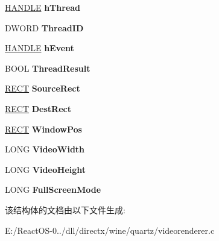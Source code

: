 \begin{DoxyCompactItemize}
\hyperlink{interfacevoid}{H\+A\+N\+D\+LE} {\bfseries h\+Thread}
\item 
\mbox{\label{struct_video_renderer_impl_aaca744e00d052fc034dd30f9d0a9c047}} 
D\+W\+O\+RD {\bfseries Thread\+ID}
\item 
\mbox{\label{struct_video_renderer_impl_a678ee72574f8cb5e784d7cd55672c141}} 
\hyperlink{interfacevoid}{H\+A\+N\+D\+LE} {\bfseries h\+Event}
\item 
\mbox{\label{struct_video_renderer_impl_a767c96e90d3a68f8a3ae5ce61af88989}} 
B\+O\+OL {\bfseries Thread\+Result}
\item 
\mbox{\label{struct_video_renderer_impl_ab3c1711b296676bb81d0e29cc5f571c8}} 
\hyperlink{structtag_r_e_c_t}{R\+E\+CT} {\bfseries Source\+Rect}
\item 
\mbox{\label{struct_video_renderer_impl_a2331a84757e41abddde45e1f395f91f5}} 
\hyperlink{structtag_r_e_c_t}{R\+E\+CT} {\bfseries Dest\+Rect}
\item 
\mbox{\label{struct_video_renderer_impl_af51f62717624ee2c892d44eb7d07a98c}} 
\hyperlink{structtag_r_e_c_t}{R\+E\+CT} {\bfseries Window\+Pos}
\item 
\mbox{\label{struct_video_renderer_impl_abe65e8b2bfc8cc585b25beed5772de87}} 
L\+O\+NG {\bfseries Video\+Width}
\item 
\mbox{\label{struct_video_renderer_impl_afeb01986d34e1871a3d90d5c8509ce4c}} 
L\+O\+NG {\bfseries Video\+Height}
\item 
\mbox{\label{struct_video_renderer_impl_a77cfb6dd7be092c07a681752babcb75b}} 
L\+O\+NG {\bfseries Full\+Screen\+Mode}
\end{DoxyCompactItemize}


该结构体的文档由以下文件生成\+:\begin{DoxyCompactItemize}
\item 
E\+:/\+React\+O\+S-\/0../dll/directx/wine/quartz/videorenderer.\+c\end{DoxyCompactItemize}
